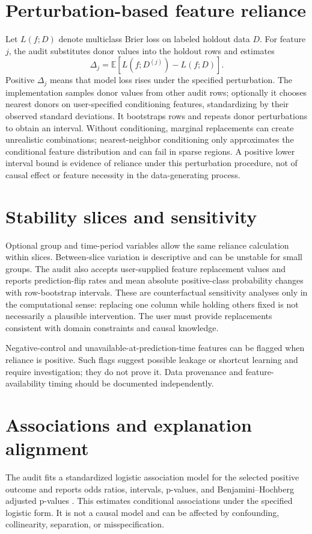 \documentclass[conference]{IEEEtran}
\begin{document}
\section{Perturbation-based feature reliance}
Let \(L(f;D)\) denote multiclass Brier loss on labeled holdout data \(D\). For feature \(j\), the audit substitutes donor values into the holdout rows and estimates
\[
\Delta_j=\mathbb{E}\left[L(f;D^{(j)})-L(f;D)\right].
\]
Positive \(\Delta_j\) means that model loss rises under the specified perturbation. The implementation samples donor values from other audit rows; optionally it chooses nearest donors on user-specified conditioning features, standardizing by their observed standard deviations. It bootstraps rows and repeats donor perturbations to obtain an interval. Without conditioning, marginal replacements can create unrealistic combinations; nearest-neighbor conditioning only approximates the conditional feature distribution and can fail in sparse regions. A positive lower interval bound is evidence of reliance under this perturbation procedure, not of causal effect or feature necessity in the data-generating process.

\section{Stability slices and sensitivity}
Optional group and time-period variables allow the same reliance calculation within slices. Between-slice variation is descriptive and can be unstable for small groups. The audit also accepts user-supplied feature replacement values and reports prediction-flip rates and mean absolute positive-class probability changes with row-bootstrap intervals. These are counterfactual sensitivity analyses only in the computational sense: replacing one column while holding others fixed is not necessarily a plausible intervention. The user must provide replacements consistent with domain constraints and causal knowledge.

Negative-control and unavailable-at-prediction-time features can be flagged when reliance is positive. Such flags suggest possible leakage or shortcut learning and require investigation; they do not prove it. Data provenance and feature-availability timing should be documented independently.

\section{Associations and explanation alignment}
The audit fits a standardized logistic association model for the selected positive outcome and reports odds ratios, intervals, p-values, and Benjamini--Hochberg adjusted p-values \cite{benjamini1995}. This estimates conditional associations under the specified logistic form. It is not a causal model and can be affected by confounding, collinearity, separation, or misspecification.
\end{document}
